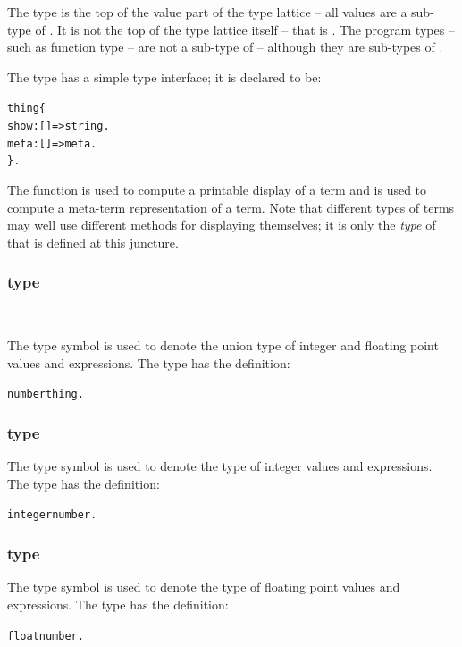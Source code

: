 
The  type is the top of the value part of the type lattice -- all values are a sub-type of . It is not the top of the type lattice itself -- that is . The program types -- such as function type -- are not a sub-type of  -- although they are sub-types of .

The  type has a simple type interface; it is declared to be:
\begin{alltt}
thing \impl \{ 
  show:[]=>string.
  meta:[]=>meta.
  \}.
\end{alltt}
The  function is used to compute a printable  display of a term and  is used to compute a meta-term representation of a term. Note that different types of terms may well use different methods for displaying themselves; it is only the \emph{type} of  that is defined at this juncture.
  

\subsubsection{ type}\
\label{types:standard:number}

The  type symbol is used to denote the union type of integer and floating point values and expressions. The \q{number} type has the definition:
\begin{alltt}
number \impl thing.
\end{alltt}

\subsubsection{ type}
\label{types:standard:integer}

The  type symbol is used to denote the type of integer values and expressions. The \q{integer} type has the definition:
\begin{alltt}
integer \impl number.
\end{alltt}

\subsubsection{ type}
\label{types:standard:float}

The  type symbol is used to denote the type of floating point values and expressions. The \q{float} type has the definition:
\begin{alltt}
float \impl number.
\end{alltt}

